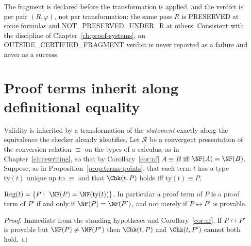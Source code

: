 The fragment is declared before the transformation is applied, and the verdict is per pair $(R,\varphi)$, not per transformation: the same pass $R$ is \textsf{PRESERVED} at some formulas and \textsf{NOT\_PRESERVED\_UNDER\_R} at others. Consistent with the discipline of Chapter~\ref{ch:proof-systems}, an \textsf{OUTSIDE\_CERTIFIED\_FRAGMENT} verdict is never reported as a failure and never as a success.

\section{Proof terms inherit along definitional equality}
\label{sec:defeq}

Validity is inherited by a transformation of the \emph{statement} exactly along the equivalence the checker already identifies. Let $\mathcal R$ be a convergent presentation of the conversion relation $\equiv$ on the types of a calculus, as in Chapter~\ref{ch:rewriting}, so that by Corollary~\ref{cor:nf} $A\equiv B$ iff $\NF(A)=\NF(B)$. Suppose, as in Proposition~\ref{prop:terms-points}, that each term $t$ has a type $\mathrm{ty}(t)$ unique up to $\equiv$ and that $\Chk(t,P)$ holds iff $\mathrm{ty}(t)\equiv P$.

\begin{proposition}
\label{prop:term-region}
$\mathrm{Reg}(t)=\{P:\ \NF(P)=\NF(\mathrm{ty}(t))\}$. In particular a proof term of $P$ is a proof term of $P'$ if and only if $\NF(P)=\NF(P')$, and not merely if $P\leftrightarrow P'$ is provable.
\end{proposition}

\begin{proof}
Immediate from the standing hypotheses and Corollary~\ref{cor:nf}. If $P\leftrightarrow P'$ is provable but $\NF(P)\ne\NF(P')$ then $\Chk(t,P)$ and $\Chk(t,P')$ cannot both hold.
\end{proof}

